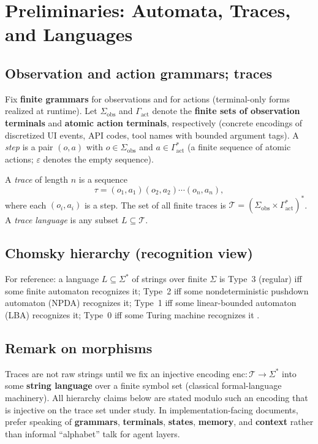 \section{Preliminaries: Automata, Traces, and Languages}
\label{sec:prelim}

\subsection{Observation and action grammars; traces}

Fix \textbf{finite grammars} for observations and for actions (terminal-only forms realized at runtime). Let $\Sigma_{\mathrm{obs}}$ and $\Gamma_{\mathrm{act}}$ denote the \textbf{finite sets of observation terminals} and \textbf{atomic action terminals}, respectively (concrete encodings of discretized UI events, API codes, tool names with bounded argument tags). A \emph{step} is a pair $(o,a)$ with $o \in \Sigma_{\mathrm{obs}}$ and $a \in \Gamma_{\mathrm{act}}^\ast$ (a finite sequence of atomic actions; $\varepsilon$ denotes the empty sequence).

A \emph{trace} of length $n$ is a sequence
\[
\tau = (o_1,a_1)(o_2,a_2)\cdots(o_n,a_n),
\]
where each $(o_i,a_i)$ is a step. The set of all finite traces is $\mathcal{T} = (\Sigma_{\mathrm{obs}} \times \Gamma_{\mathrm{act}}^\ast)^\ast$. A \emph{trace language} is any subset $L \subseteq \mathcal{T}$.

\subsection{Chomsky hierarchy (recognition view)}

For reference: a language $L \subseteq \Sigma^\ast$ of strings over finite $\Sigma$ is Type~3 (regular) iff some finite automaton recognizes it; Type~2 iff some nondeterministic pushdown automaton (NPDA) recognizes it; Type~1 iff some linear-bounded automaton (LBA) recognizes it; Type~0 iff some Turing machine recognizes it \citep{hopcroft2006automata}.

\subsection{Remark on morphisms}

Traces are not raw strings until we fix an injective encoding $\mathrm{enc} : \mathcal{T} \to \Sigma^\ast$ into some \textbf{string language} over a finite symbol set (classical formal-language machinery). All hierarchy claims below are stated modulo such an encoding that is injective on the trace set under study. In implementation-facing documents, prefer speaking of \textbf{grammars}, \textbf{terminals}, \textbf{states}, \textbf{memory}, and \textbf{context} rather than informal ``alphabet'' talk for agent layers.
